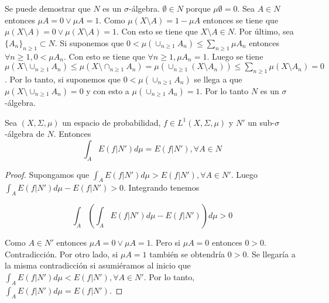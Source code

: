 Se puede demostrar que $N$ es un $\sigma$-álgebra. $\emptyset \in N$ porque $\mu \emptyset = 0$. Sea $A \in N$ entonces $\mu A = 0 \vee \mu A = 1$. Como $\mu(X \setminus A) = 1 - \mu A$ entonces se tiene que $\mu(X \setminus A) = 0 \vee \mu(X \setminus A) = 1$. Con esto se tiene que $X \setminus A \in N$. Por último, sea $\{A_n\}_{n \geq 1} \subset N$.  Si suponemos que $0 < \mu(\cup_{n \geq 1} A_n) \leq \sum_{n \geq 1} \mu A_n$ entonces $\forall n \geq 1, 0 < \mu A_n$. Con esto se tiene que $\forall n \geq 1, \mu A_n = 1$. Luego se tiene $\mu(X \setminus \cup_{n \geq 1} A_n) \leq \mu(X \setminus \cap_{n \geq 1} A_n) = \mu(\cup_{n \geq 1} (X \setminus A_n)) \leq \sum_{n \geq 1} \mu(X \setminus A_n) = 0$. Por lo tanto, si suponemos que $0 < \mu(\cup_{n \geq 1} A_n)$  se llega a que \mbox{$\mu(X \setminus \cup_{n \geq 1} A_n) = 0$} y con esto a $\mu(\cup_{n \geq 1} A_n) = 1$. Por lo tanto $N$ es un $\sigma$-álgebra.

\begin{propiedad}\label{esperanza_en_sigma-algebra_trivial}
	Sea $(X,\Sigma,\mu)$ un espacio de probabilidad, $f \in L^1(X,\Sigma,\mu)$ y $N'$ un sub-$\sigma$-álgebra de $N$. Entonces	
	\begin{equation}
	\int_A E(f|N') d\mu = E(f|N'), \forall A \in N
	\end{equation}
\end{propiedad}

\begin{proof}
	Supongamos que $\int_A E(f|N') d\mu > E(f|N'), \forall A \in N'$. Luego $\int_A E(f|N') d\mu - E(f|N') > 0$. Integrando tenemos
	
	\begin{equation}
	\int_A \left( \int_A E(f|N')d\mu - E(f|N') \right) d\mu > 0
	\end{equation}
	
	Como $A \in N'$ entonces $\mu A = 0 \vee \mu A = 1$. Pero si $\mu A = 0$ entonces $0>0$. Contradicción. Por otro lado, si $\mu A = 1$ también se obtendría $0>0$. Se llegaría a la misma contradicción si asumiéramos al inicio que \mbox{$\int_A E(f|N') d\mu < E(f|N'), \forall A \in N'$}. Por lo tanto, $\int_A E(f|N') d\mu = E(f|N')$.
\end{proof}